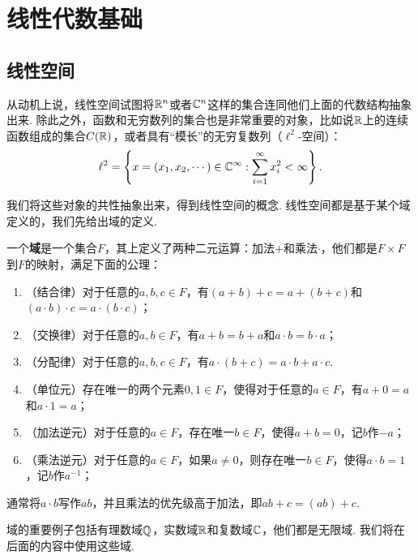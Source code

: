 \chapter{线性代数基础}\label{chap:linear-algebra}

\section{线性空间}

从动机上说，线性空间试图将$\mathbb{R}^n$或者$\mathbb{C}^n$这样的集合连同他们上面的代数结构抽象出来. 除此之外，函数和无穷数列的集合也是非常重要的对象，比如说$\mathbb{R}$上的连续函数组成的集合$C(\mathbb{R})$，或者具有“模长”的无穷复数列（$\ell^2$-空间）：
\[\ell^2=\left\{x=(x_1,x_2,\cdots)\in\mathbb{C}^\infty:\sum_{i=1}^\infty x_i^2<\infty\right\}.\]

我们将这些对象的共性抽象出来，得到线性空间的概念. 线性空间都是基于某个域定义的，我们先给出域的定义. 

\begin{definition}[域]
一个\textbf{域}是一个集合$F$，其上定义了两种二元运算：加法$+$和乘法$\cdot$，他们都是$F\times F$到$F$的映射，满足下面的公理：
\begin{enumerate}
    \item （结合律）对于任意的$a,b,c\in F$，有$(a+b)+c=a+(b+c)$和$(a\cdot b)\cdot c=a\cdot (b\cdot c)$；
    \item （交换律）对于任意的$a,b\in F$，有$a+b=b+a$和$a\cdot b=b\cdot a$；
    \item（分配律）对于任意的$a,b,c\in F$，有$a\cdot(b+c)=a\cdot b+a\cdot c$. 
    \item （单位元）存在唯一的两个元素$0,1\in F$，使得对于任意的$a\in F$，有$a+0=a$和$a\cdot 1=a$；
    \item （加法逆元）对于任意的$a\in F$，存在唯一$b\in F$，使得$a+b=0$，记$b$作$-a$；
    \item （乘法逆元）对于任意的$a\in F$，如果$a\neq 0$，则存在唯一$b\in F$，使得$a\cdot b=1$，记$b$作$a^{-1}$；
\end{enumerate}
通常将$a\cdot b$写作$ab$，并且乘法的优先级高于加法，即$ab+c=(ab)+c$. 
\end{definition}

域的重要例子包括有理数域$\mathbb{Q}$，实数域$\mathbb{R}$和复数域$\mathbb{C}$，他们都是无限域. 我们将在后面的内容中使用这些域. 

